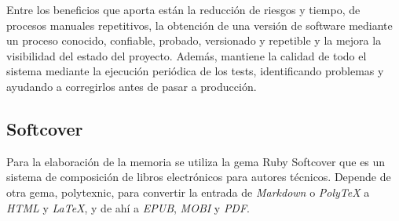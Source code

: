 Entre los beneficios que aporta están la reducción de riesgos y tiempo, de procesos manuales repetitivos, la obtención de una versión de software mediante un proceso conocido, confiable, probado, versionado y repetible y la mejora la visibilidad del estado del proyecto. Además, mantiene la calidad de todo el sistema mediante la ejecución periódica de los tests, identificando problemas y ayudando a corregirlos antes de pasar a producción.

\subsection{Softcover}

Para la elaboración de la memoria se utiliza la gema Ruby Softcover\cite{softcover} que es un sistema de composición de libros electrónicos para autores técnicos. Depende de otra gema, polytexnic, para convertir la entrada de \textit{Markdown} o \textit{PolyTeX} a \textit{HTML} y \textit{LaTeX}, y de ahí a \textit{EPUB}, \textit{MOBI} y \textit{PDF}.


